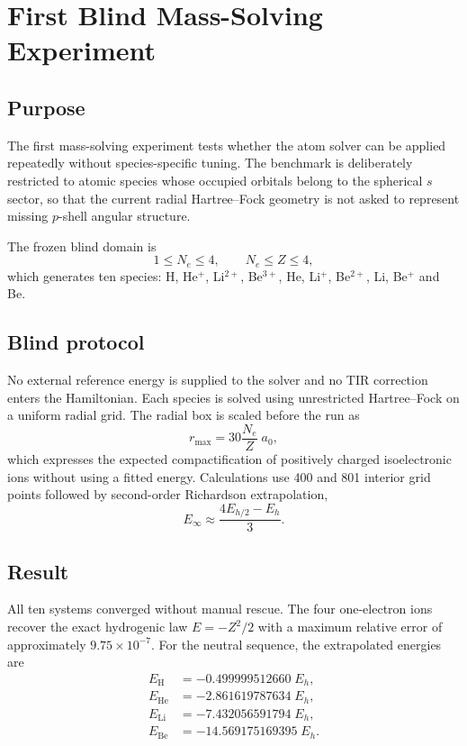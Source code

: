 \chapter{First Blind Mass-Solving Experiment}

\section{Purpose}
The first mass-solving experiment tests whether the atom solver can be applied repeatedly without species-specific tuning. The benchmark is deliberately restricted to atomic species whose occupied orbitals belong to the spherical $s$ sector, so that the current radial Hartree--Fock geometry is not asked to represent missing $p$-shell angular structure.

The frozen blind domain is
\begin{equation}
1\le N_e\le 4,\qquad N_e\le Z\le 4,
\end{equation}
which generates ten species: H, He$^+$, Li$^{2+}$, Be$^{3+}$, He, Li$^+$, Be$^{2+}$, Li, Be$^+$ and Be.

\section{Blind protocol}
No external reference energy is supplied to the solver and no TIR correction enters the Hamiltonian. Each species is solved using unrestricted Hartree--Fock on a uniform radial grid. The radial box is scaled before the run as
\begin{equation}
r_{\max}=30\frac{N_e}{Z}\;a_0,
\end{equation}
which expresses the expected compactification of positively charged isoelectronic ions without using a fitted energy. Calculations use 400 and 801 interior grid points followed by second-order Richardson extrapolation,
\begin{equation}
E_{\infty}\approx\frac{4E_{h/2}-E_h}{3}.
\end{equation}

\section{Result}
All ten systems converged without manual rescue. The four one-electron ions recover the exact hydrogenic law $E=-Z^2/2$ with a maximum relative error of approximately $9.75\times10^{-7}$. For the neutral sequence, the extrapolated energies are
\begin{align}
E_{\mathrm H}  &= -0.499999512660\;E_h,\\
E_{\mathrm{He}}&= -2.861619787634\;E_h,\\
E_{\mathrm{Li}}&= -7.432056591794\;E_h,\\
E_{\mathrm{Be}}&= -14.569175169395\;E_h.
\end{align}

